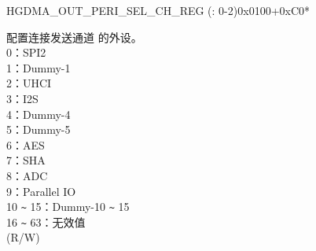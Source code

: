 \begin{register}{H}{GDMA\_OUT\_PERI\_SEL\_CH\_REG (: 0-2)}{0x0100+0xC0*}\label{regdesc:GDMAOUTPERISELCHNREG}
%
%
\regnewline%
\begin{regdesc}\begin{reglist}
\label{fielddesc:GDMAPERIOUTSELCHN}\item [GDMA\_PERI\_OUT\_SEL\_CH\regindex{n}] 配置连接发送通道  的外设。\\
0：SPI2\\
1：Dummy-1\\
2：UHCI\\
3：I2S\\
4：Dummy-4\\
5：Dummy-5\\
6：AES\\
7：SHA\\
8：ADC\\
9：Parallel IO\\
10 \verb+~+  15：Dummy-10  \verb+~+  15\\
16 \verb+~+ 63：无效值\\
(R/W)
\end{reglist}\end{regdesc}
\end{register}
